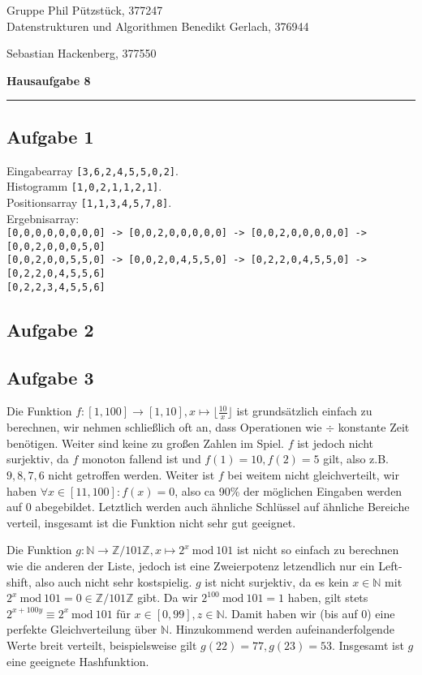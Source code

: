 \documentclass[a4paper,graphics,11pt]{article}
\newcommand{\aufgabe}[1]{\subsection*{Aufgabe #1}}
\begin{document}
\noindent Gruppe              \hfill Phil Pützstück, 377247\\
\noindent Datenstrukturen und Algorithmen \hfill Benedikt Gerlach, 376944\\
\strut\hfill Sebastian Hackenberg, 377550\\
\begin{center}
	\LARGE{\textbf{Hausaufgabe 8}}
\end{center}
\begin{center}
\rule[0.1ex]{\textwidth}{1pt}
\end{center}

\aufgabe{1}
Eingabearray \texttt{[3,6,2,4,5,5,0,2]}.\\
Histogramm \texttt{[1,0,2,1,1,2,1]}.\\
Positionsarray \texttt{[1,1,3,4,5,7,8]}.\\
Ergebnisarray:\\
\texttt{[0,0,0,0,0,0,0,0] -> [0,0,2,0,0,0,0,0] -> [0,0,2,0,0,0,0,0] -> [0,0,2,0,0,0,5,0]}\\
\texttt{[0,0,2,0,0,5,5,0] -> [0,0,2,0,4,5,5,0] -> [0,2,2,0,4,5,5,0] -> [0,2,2,0,4,5,5,6]}\\
\texttt{[0,2,2,3,4,5,5,6]}

\aufgabe{2}
\aufgabe{3}
Die Funktion $f : [1,100] \to [1,10], x \mapsto \lfloor \frac{10}{x} \rfloor$ ist grundsätzlich einfach zu berechnen,
wir nehmen schließlich oft an, dass Operationen wie $\div$ konstante Zeit benötigen. Weiter sind keine zu großen Zahlen im Spiel.
$f$ ist jedoch nicht surjektiv, da $f$ monoton fallend ist und $f(1) = 10, f(2) = 5$ gilt, also z.B. $9,8,7,6$ nicht getroffen
werden. Weiter ist $f$ bei weitem nicht gleichverteilt, wir haben $\forall x \in [11, 100] : f(x) = 0$, also ca 90\% der
möglichen Eingaben werden auf 0 abegebildet. Letztlich werden auch ähnliche Schlüssel auf ähnliche Bereiche verteil, insgesamt
ist die Funktion nicht sehr gut geeignet.

Die Funktion $g:\mathbb{N} \to \mathbb{Z}/101\mathbb{Z}, x \mapsto 2^x\ \text{mod}\ 101$ ist nicht so einfach zu berechnen wie
die anderen der Liste, jedoch ist eine Zweierpotenz letzendlich nur ein Left-shift, also auch nicht sehr kostspielig.
$g$ ist nicht surjektiv, da es kein $x \in \mathbb{N}$ mit $2^x\ \text{mod}\ 101 = 0 \in \mathbb{Z}/101\mathbb{Z}$ gibt.
Da wir $2^{100}\ \text{mod}\ 101 = 1$ haben,
gilt stets $2^{x+100y} \equiv 2^x\ \text{mod}\ 101$ für $x \in [0,99], z \in \mathbb{N}$. Damit haben wir (bis auf 0) eine
perfekte Gleichverteilung über $\mathbb{N}$. Hinzukommend werden aufeinanderfolgende Werte breit verteilt, beispielsweise
gilt $g(22) = 77, g(23) = 53$. Insgesamt ist $g$ eine geeignete Hashfunktion.
\end{document}
